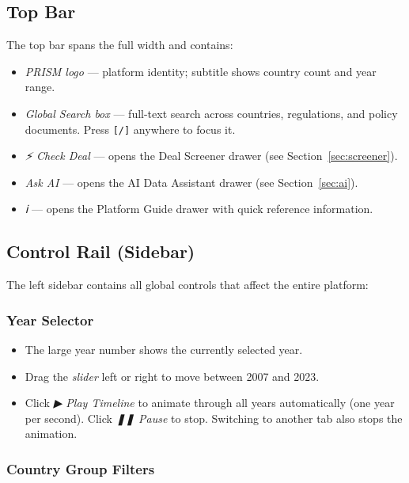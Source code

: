 \documentclass[12pt,a4paper]{article}
\newcommand{\keycap}[1]{%
  \texttt{\footnotesize[#1]}%
}
\newcommand{\uielem}[1]{\textit{#1}}
\begin{document}
\subsection{Top Bar}

The top bar spans the full width and contains:

\begin{itemize}
  \item \uielem{PRISM logo} — platform identity; subtitle shows country count and year range.
  \item \uielem{Global Search box} — full-text search across countries, regulations, and policy documents. Press \keycap{/} anywhere to focus it.
  \item \uielem{⚡ Check Deal} — opens the Deal Screener drawer (see Section~\ref{sec:screener}).
  \item \uielem{Ask AI} — opens the AI Data Assistant drawer (see Section~\ref{sec:ai}).
  \item \uielem{ℹ} — opens the Platform Guide drawer with quick reference information.
\end{itemize}

\subsection{Control Rail (Sidebar)}
\label{sec:rail}

The left sidebar contains all global controls that affect the entire platform:

\subsubsection{Year Selector}

\begin{itemize}
  \item The large year number shows the currently selected year.
  \item Drag the \uielem{slider} left or right to move between 2007 and 2023.
  \item Click \uielem{▶ Play Timeline} to animate through all years automatically (one year per second). Click \uielem{❚❚ Pause} to stop. Switching to another tab also stops the animation.
\end{itemize}

\subsubsection{Country Group Filters}
\end{document}
